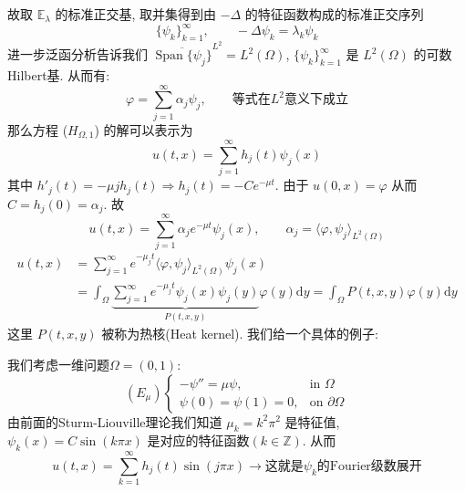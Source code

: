 \documentclass[11pt]{ctexart}[UTF8]
\begin{document}
故取 $\mathbb{E}_{\lambda}$ 的标准正交基, 取并集得到由 $-\Delta$ 的特征函数构成的标准正交序列 
$$\{\psi_{k}\}_{k=1}^{\infty},\quad\quad-\Delta \psi_k = \lambda_k \psi_k$$
进一步泛函分析告诉我们 $\overline{\operatorname{Span}\{\psi_{j}\}}^{L^{2}} = L^2(\Omega)$, $\{ \psi_k \}_{k=1}^{\infty}$ 是 $L^2(\Omega)$ 的可数
Hilbert基. 从而有:
\begin{equation*}
    \varphi = \sum_{j=1}^{\infty} \alpha_{j} \psi_j,\quad\quad \text{等式在}L^2\text{意义下成立}
\end{equation*}
那么方程 ($H_{\Omega,1}$) 的解可以表示为
\begin{equation*}
    u(t,x) = \sum_{j=1}^{\infty} h_{j}(t) \psi_j(x)
\end{equation*}
其中 $h'_j(t) = -\mu{j} h_j(t)\Longrightarrow h_j(t) = -Ce^{-\mu t}$. 由于 $u(0,x) = \varphi$ 从而 $C =h_{j}(0)= \alpha_j$. 故
\begin{equation*}
    u(t,x) = \sum_{j=1}^{\infty} \alpha_j e^{-\mu t}  \psi_j(x),\quad\quad \alpha_{j} = \langle \varphi, \psi_j \rangle_{L^2(\Omega)}
\end{equation*}
\begin{equation*}
    \begin{aligned}
            u(t,x)  &= \sum_{j=1}^{\infty} e^{-\mu_{j} t} \langle \varphi, \psi_j \rangle_{L^2(\Omega)} \psi_j(x)\\
                    &= \int_{\Omega} \underbrace{\sum_{j=1}^{\infty} e^{-\mu_j t} \psi_j(x) \psi_j(y)}_{P(t,x,y)} \varphi(y) \mathrm{d}y = \int_{\Omega} P(t,x,y) \varphi(y) \mathrm{d}y
    \end{aligned}
\end{equation*}
这里 $P(t,x,y)$ 被称为热核(Heat kernel). 我们给一个具体的例子:
\begin{example}
    我们考虑一维问题$\Omega = (0,1)$:
    \begin{equation*}
        (E_{\mu})
        \begin{cases}
            -\psi'' = \mu \psi, & \text{in } \Omega\\
            \psi(0) = \psi(1) = 0, & \text{on } \partial\Omega
        \end{cases}
    \end{equation*}
    由前面的Sturm-Liouville理论我们知道 $\mu_k = k^2 \pi^2$ 是特征值, $\psi_k(x) = C\sin(k\pi x)$ 是对应的特征函数$(k \in \mathbb{Z})$. 从而
    \begin{equation*}
        u(t,x) = \sum_{k=1}^{\infty} h_{j}(t)\sin(j\pi x) \longrightarrow \text{这就是}\psi_k\text{的Fourier级数展开}
    \end{equation*}
\end{example}
\end{document}
